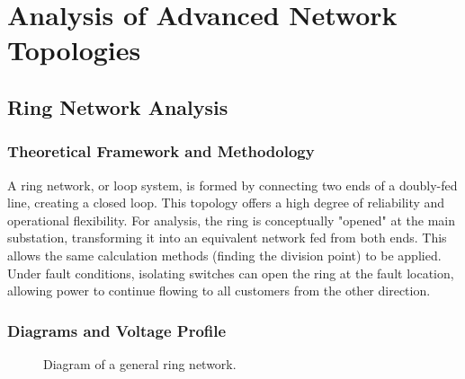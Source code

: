 \documentclass[12pt, a4paper]{article}
\begin{document}
\section{Analysis of Advanced Network Topologies}
\subsection{Ring Network Analysis}
\subsubsection{Theoretical Framework and Methodology}
A ring network, or loop system, is formed by connecting two ends of a doubly-fed line, creating a closed loop. This topology offers a high degree of reliability and operational flexibility. For analysis, the ring is conceptually "opened" at the main substation, transforming it into an equivalent network fed from both ends. This allows the same calculation methods (finding the division point) to be applied. Under fault conditions, isolating switches can open the ring at the fault location, allowing power to continue flowing to all customers from the other direction.

\subsubsection{Diagrams and Voltage Profile}
\begin{figure}[htbp]
    \centering
    \caption{Diagram of a general ring network.}
    \label{fig:ring_diagram}
\end{figure}
\end{document}
